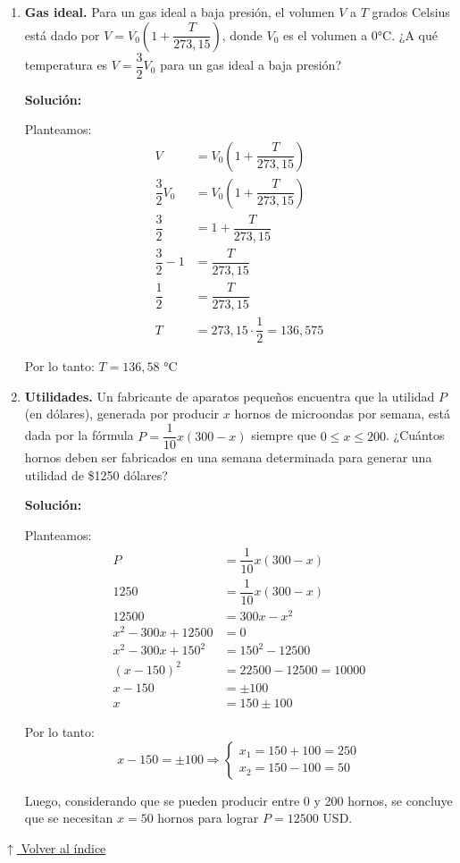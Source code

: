 \documentclass[12pt]{article}
\newcommand{\solucion}{%
    \vspace{0.8em}%
    \textbf{Solución:}%
}
\newcommand{\volverindice}{%
    \vspace{1em}%
    \begin{flushright}%
        \hyperlink{indice}{\small $\uparrow$ Volver al índice}%
    \end{flushright}%
}
\begin{document}
\begin{enumerate}[label=\alph*.-]
\item \textbf{Gas ideal.} Para un gas ideal a baja presión, el volumen $V$ a $T$ grados Celsius está dado por $V = V_0\left(1 + \dfrac{T}{273{,}15}\right)$, donde $V_0$ es el volumen a 0°C. ¿A qué temperatura es $V = \dfrac{3}{2}V_0$ para un gas ideal a baja presión?

\solucion

Planteamos:
\begin{align*}
V &= V_0\left(1 + \dfrac{T}{273{,}15}\right) \\[0.3em]
\dfrac{3}{2}V_0 &= V_0\left(1 + \dfrac{T}{273{,}15}\right) \\[0.3em]
\dfrac{3}{2} &= 1 + \dfrac{T}{273{,}15} \\[0.3em]
\dfrac{3}{2} - 1 &= \dfrac{T}{273{,}15} \\[0.3em]
\dfrac{1}{2} &= \dfrac{T}{273{,}15} \\[0.3em]
T &= 273{,}15 \cdot \dfrac{1}{2} = 136{,}575
\end{align*}

Por lo tanto: $\boxed{T = 136{,}58 \text{ °C}}$

\newpage
\item \textbf{Utilidades.} Un fabricante de aparatos pequeños encuentra que la utilidad $P$ (en dólares), generada por producir $x$ hornos de microondas por semana, está dada por la fórmula $P = \dfrac{1}{10}x(300 - x)$ siempre que $0 \leq x \leq 200$. ¿Cuántos hornos deben ser fabricados en una semana determinada para generar una utilidad de \$1250 dólares?

\solucion

Planteamos:
\begin{align*}
P &= \dfrac{1}{10}x(300 - x) \\[0.3em]
1250 &= \dfrac{1}{10}x(300 - x) \\[0.3em]
12500 &= 300x - x^2 \\[0.3em]
x^2 - 300x + 12500 &= 0 \\[0.3em]
x^2 - 300x + 150^2 &= 150^2 - 12500 \\[0.3em]
(x - 150)^2 &= 22500 - 12500 = 10000 \\[0.3em]
x - 150 &= \pm 100 \\[0.3em]
x &= 150 \pm 100
\end{align*}

Por lo tanto:
\[
x - 150 = \pm 100 \Rightarrow \begin{cases} x_1 = 150 + 100 = 250 \\ x_2 = 150 - 100 = 50 \end{cases}
\]

Luego, considerando que se pueden producir entre 0 y 200 hornos, se concluye que se necesitan $\boxed{x = 50 \text{ hornos}}$ para lograr $P = 12500$ USD.
\end{enumerate}
\volverindice
\newpage
\end{document}
